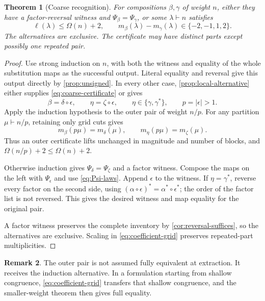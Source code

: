 \documentclass[11pt,a4paper]{amsart}
\numberwithin{equation}{section}
\theoremstyle{plain}
\newtheorem{theorem}{Theorem}[section]
\theoremstyle{definition}
\newtheorem{remark}[theorem]{Remark}
\begin{document}
\begin{theorem}[Coarse recognition]\label{thm:coarse}
For compositions \(\beta,\gamma\) of weight \(n\), either they have a
factor-reversal witness and \(\Psi_\beta=\Psi_\gamma\), or some
\(\lambda\vdash n\) satisfies
\begin{equation}\label{eq:coarse-certificate}
\ell(\lambda)\le\Omega(n)+2,
\qquad m_\beta(\lambda)-m_\gamma(\lambda)\in\{-2,-1,1,2\}.
\end{equation}
The alternatives are exclusive.  The certificate may have distinct parts
except possibly one repeated pair.
\end{theorem}
\begin{proof}
Use strong induction on \(n\), with both the witness and equality of the
whole substitution maps as the successful output.
Literal equality and reversal give this output directly by
\cref{prop:unsigned}.  In every other case, \cref{prop:local-alternative}
either supplies \eqref{eq:coarse-certificate} or gives
\[
\beta=\delta\circ\epsilon,\qquad
\eta=\zeta\circ\epsilon,\qquad
\eta\in\{\gamma,\gamma^*\},\qquad p=|\epsilon|>1.
\]
Apply the induction hypothesis to the outer pair of weight \(n/p\).
For any partition \(\mu\vdash n/p\), retaining only grid cuts gives
\begin{equation}\label{eq:coefficient-grid}
m_\beta(p\mu)=m_\delta(\mu),\qquad
m_\eta(p\mu)=m_\zeta(\mu).
\end{equation}
Thus an outer certificate lifts unchanged in magnitude and number of
blocks, and \(\Omega(n/p)+2\le\Omega(n)+2\).

Otherwise induction gives \(\Psi_\delta=\Psi_\zeta\) and a factor witness.
Compose the maps on the left with \(\Psi_\epsilon\) and use
\eqref{eq:Psi-laws}.  Append \(\epsilon\) to the witness.  If
\(\eta=\gamma^*\), reverse every factor on the second side, using
\((\alpha\circ\epsilon)^*=\alpha^*\circ\epsilon^*\); the order of the
factor list is not reversed.  This gives the desired witness and map
equality for the original pair.

A factor witness preserves the complete inventory by
\cref{cor:reversal-suffices}, so the alternatives are exclusive.
Scaling in \eqref{eq:coefficient-grid} preserves repeated-part
multiplicities.
\end{proof}

\begin{remark}\label{rem:shallow-induction}
The outer pair is not assumed fully equivalent at extraction.  It receives
the induction alternative.  In a formulation starting from shallow
congruence, \eqref{eq:coefficient-grid} transfers that shallow congruence,
and the smaller-weight theorem then gives full equality.
\end{remark}
\end{document}
